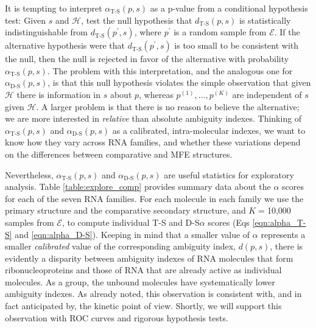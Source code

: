 \documentclass[10pt,letterpaper]{article}
\begin{document}
It is tempting to interpret $\alpha_\text{T-S}(p,s)$ as a p-value from a conditional hypothesis test: Given $s$ and $\mathcal{H}$, test the null hypothesis that $d_\text{T-S}(p,s)$ is statistically indistinguishable from  
$d_\text{T-S}(p^\prime,s)$, where $p^\prime$ is a random sample from $\mathcal{E}$. If the alternative hypothesis were that $d_\text{T-S}(p^\prime,s)$ is too small to be consistent with the null,  then the null is rejected in favor of the alternative with probability $\alpha_\text{T-S}(p,s)$. The problem with this interpretation, and the analogous one for $\alpha_\text{D-S}(p,s)$, is that this null hypothesis violates the simple observation that given $\mathcal{H}$ there is information in $s$ about $p$, whereas  $p^{(1)},\ldots,p^{(K)}$ are independent of $s$ given $\mathcal{H}$. A larger problem is that there is no reason to believe the alternative; we are more interested in {\em relative} than absolute ambiguity indexes. Thinking of  
$\alpha_\text{T-S}(p,s)$ and $\alpha_\text{D-S}(p,s)$ as a calibrated, intra-molecular indexes, we want to know how they vary across RNA families, and whether these variations depend on the differences between comparative and MFE structures.

Nevertheless, $\alpha_\text{T-S}(p,s)$ and $\alpha_\text{D-S}(p,s)$ are useful statistics for exploratory analysis.  Table \ref{table:explore_comp} provides summary data about the $\alpha$ scores for each of the seven RNA families. 
For each molecule in each family we use the primary structure and the comparative secondary structure, and $K=$10,000 samples from $\mathcal{E}$, to compute
individual T-S and D-S$\alpha$ scores (Eqs \ref{eqn:alpha_T-S} and \ref{eqn:alpha_D-S}). Keeping in mind that a smaller value of $\alpha$ represents a smaller {\em calibrated} value of the corresponding ambiguity index, $d(p,s)$, there is evidently a disparity between ambiguity indexes of RNA molecules that form ribonucleoproteins and those of RNA that are already active as individual molecules. As a group, the unbound molecules have systematically lower ambiguity indexes. As already noted, this observation is consistent with, and in fact anticipated by, the kinetic point of view. Shortly, we will support this observation with ROC curves and rigorous hypothesis tests.
\end{document}
